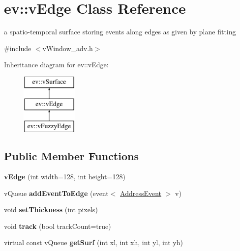 \hypertarget{classev_1_1vEdge}{}\section{ev\+:\+:v\+Edge Class Reference}
\label{classev_1_1vEdge}


a spatio-\/temporal surface storing events along edges as given by plane fitting  




{\ttfamily \#include $<$v\+Window\+\_\+adv.\+h$>$}

Inheritance diagram for ev\+:\+:v\+Edge\+:\begin{figure}[H]
\begin{center}
\leavevmode
\includegraphics[height=3.000000cm]{classev_1_1vEdge}
\end{center}
\end{figure}
\subsection*{Public Member Functions}
\begin{DoxyCompactItemize}
\item 
\mbox{\label{classev_1_1vEdge_a3bbccb1784adbb0543a22e6e1a805be5}} 
{\bfseries v\+Edge} (int width=128, int height=128)
\item 
\mbox{\label{classev_1_1vEdge_a04bc02981fe09b9cc0615a471a4d1594}} 
v\+Queue {\bfseries add\+Event\+To\+Edge} (event$<$ \hyperlink{classev_1_1AddressEvent}{Address\+Event} $>$ v)
\item 
\mbox{\label{classev_1_1vEdge_a8add033e36c36c4145d932d8e210750a}} 
void {\bfseries set\+Thickness} (int pixels)
\item 
\mbox{\label{classev_1_1vEdge_a7e0dd1c7f362d79a0cef3298caa74f8a}} 
void {\bfseries track} (bool track\+Count=true)
\item 
\mbox{\label{classev_1_1vEdge_a569d6c449ae172b608c0049e9e391e50}} 
virtual const v\+Queue {\bfseries get\+Surf} (int xl, int xh, int yl, int yh)
\end{DoxyCompactItemize}
